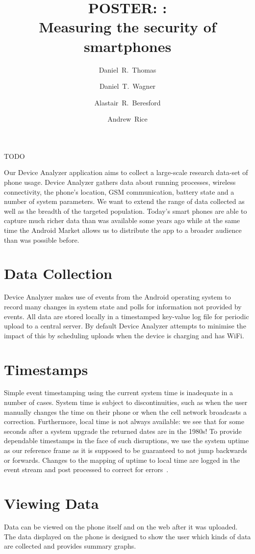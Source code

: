 \documentclass{sig-alternate}
\author{Daniel~R.~Thomas \and Daniel~T.~Wagner \and Alastair~R.~Beresford \and Andrew~Rice\\       \email{Firstname.Lastname@cl.cam.ac.uk}
}
\title{POSTER: \da :\\Measuring the security of smartphones}
\begin{document}
\maketitle

TODO

Our Device Analyzer application aims to collect a large-scale research data-set of phone usage.
Device Analyzer gathers data about running processes, wireless connectivity, the phone’s location, GSM communication, battery state and a number of system parameters.
We want to extend the range of data collected as well as the breadth of the targeted population.
Today’s smart phones are able to capture much richer data than was available some years ago while at the same time the Android Market allows us to distribute the app to a broader audience than was possible before.

\section{Data Collection}
Device Analyzer makes use of events from the Android operating system to record many changes in system state and polls for information not provided by events.
All data are stored locally in a timestamped key-value log file for periodic upload to a central server.
By default Device Analyzer attempts to minimise the impact of this by scheduling uploads when the device is charging and has WiFi.

\section{Timestamps}
Simple event timestamping using the current system time is inadequate in a number of cases.
System time is subject to discontinuities, such as when the user manually changes the time on their phone or when the cell network broadcasts a correction.
Furthermore, local time is not always available: we see that for some seconds after a system upgrade the returned dates are in the 1980s!
To provide dependable timestamps in the face of such disruptions, we use the system uptime as our reference frame as it is supposed to be guaranteed to not jump backwards or forwards.
Changes to the mapping of uptime to local time are logged in the event stream and post processed to correct for errors~\cite{Wagner2013}.

\section{Viewing Data}
Data can be viewed on the phone itself and on the web after it was uploaded.
The data displayed on the phone is designed to show the user which kinds of data are collected and provides summary graphs.
\end{document}
